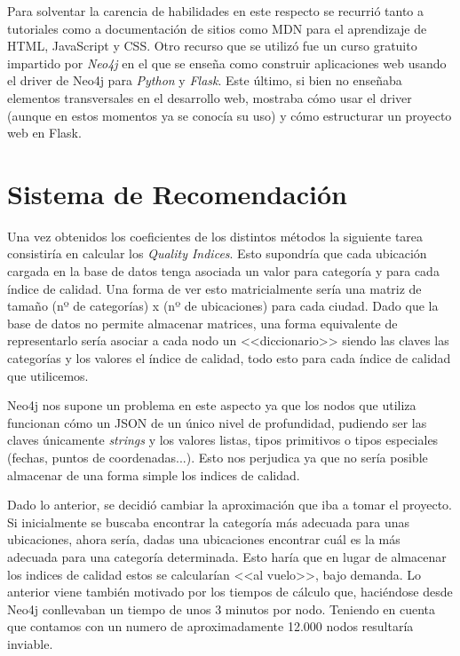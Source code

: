 Para solventar la carencia de habilidades en este respecto se recurrió tanto a tutoriales como a documentación de sitios como MDN para el aprendizaje de HTML, JavaScript y CSS. Otro recurso que se utilizó fue un curso gratuito impartido por \textit{Neo4j} en el que se enseña como construir aplicaciones web usando el driver de Neo4j para \textit{Python} y \textit{Flask}. Este último, si bien no enseñaba elementos transversales en el desarrollo web, mostraba cómo usar el driver (aunque en estos momentos ya se conocía su uso) y cómo estructurar un proyecto web en Flask.

\section{Sistema de Recomendación}

Una vez obtenidos los coeficientes de los distintos métodos la siguiente tarea consistiría en calcular los \textit{Quality Indices}. Esto supondría que cada ubicación cargada en la base de datos tenga asociada un valor para categoría y para cada índice de calidad. Una forma de ver esto matricialmente sería una matriz de tamaño (nº de categorías) x (nº de ubicaciones) para cada ciudad. Dado que la base de datos no permite almacenar matrices, una forma equivalente de representarlo sería asociar a cada nodo un <<diccionario>> siendo las claves las categorías y los valores el índice de calidad, todo esto para cada índice de calidad que utilicemos.

Neo4j nos supone un problema en este aspecto ya que los nodos que utiliza funcionan cómo un JSON de un único nivel de profundidad, pudiendo ser las claves únicamente \textit{strings} y los valores listas, tipos primitivos o tipos especiales (fechas, puntos de coordenadas...). Esto nos perjudica ya que no sería posible almacenar de una forma simple los indices de calidad.

Dado lo anterior, se decidió cambiar la aproximación que iba a tomar el proyecto. Si inicialmente se buscaba encontrar la categoría más adecuada para unas ubicaciones, ahora sería, dadas una ubicaciones encontrar cuál es la más adecuada para una categoría determinada. Esto haría que en lugar de almacenar los indices de calidad estos se calcularían <<al vuelo>>, bajo demanda. Lo anterior viene también motivado por los tiempos de cálculo que, haciéndose desde Neo4j conllevaban un tiempo de unos 3 minutos por nodo. Teniendo en cuenta que contamos con un numero de aproximadamente 12.000 nodos resultaría inviable.

